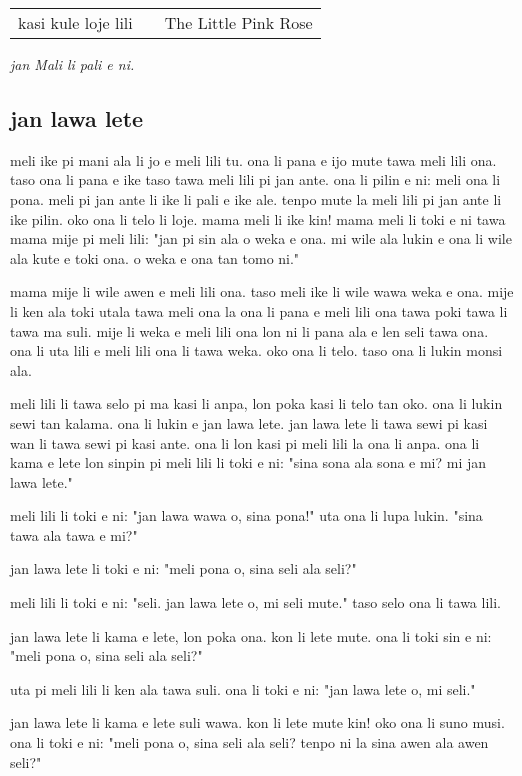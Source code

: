 \begin{supertabular}{p{5,5cm}|ll}
    kasi kule loje lili &  & The Little Pink Rose \\
\end{supertabular}

\textit{jan Mali li pali e ni. \cite{www:astrodonunt:01}}

\newpage

\subsection{jan lawa lete}
meli ike pi mani ala li jo e meli lili tu.
ona li pana e ijo mute tawa meli lili ona.
taso ona li pana e ike taso tawa meli lili pi jan ante.
ona li pilin e ni: meli ona li pona.
meli pi jan ante li ike li pali e ike ale.
tenpo mute la meli lili pi jan ante li ike pilin.
oko ona li telo li loje.
mama meli li ike kin!
mama meli li toki e ni tawa mama mije pi meli lili:
"jan pi sin ala o weka e ona.
mi wile ala lukin e ona li wile ala kute e toki ona.
o weka e ona tan tomo ni."

mama mije li wile awen e meli lili ona.
taso meli ike li wile wawa weka e ona.
mije li ken ala toki utala tawa meli ona la ona li pana e meli lili ona tawa poki tawa li tawa ma suli.
mije li weka e meli lili ona lon ni li pana ala e len seli tawa ona.
ona li uta lili e meli lili ona li tawa weka.
oko ona li telo.
taso ona li lukin monsi ala.

meli lili li tawa selo pi ma kasi li anpa, lon poka kasi li telo tan oko.
ona li lukin sewi tan kalama.
ona li lukin e jan lawa lete.
jan lawa lete li tawa sewi pi kasi wan li tawa sewi pi kasi ante.
ona li lon kasi pi meli lili la ona li anpa.
ona li kama e lete lon sinpin pi meli lili li toki e ni:
"sina sona ala sona e mi?
mi jan lawa lete."

meli lili li toki e ni:
"jan lawa wawa o, sina pona!"
uta ona li lupa lukin.
"sina tawa ala tawa e mi?"

jan lawa lete li toki e ni:
"meli pona o, sina seli ala seli?"

meli lili li toki e ni:
"seli.
jan lawa lete o, mi seli mute."
taso selo ona li tawa lili.

jan lawa lete li kama e lete, lon poka ona.
kon li lete mute.
ona li toki sin e ni:
"meli pona o, sina seli ala seli?"

uta pi meli lili li ken ala tawa suli.
ona li toki e ni:
"jan lawa lete o, mi seli."

jan lawa lete li kama e lete suli wawa.
kon li lete mute kin!
oko ona li suno musi.
ona li toki e ni:
"meli pona o, sina seli ala seli?
tenpo ni la sina awen ala awen seli?"


